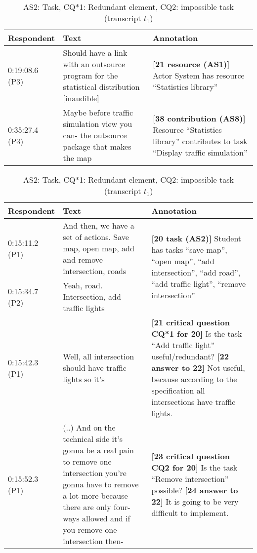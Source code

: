 \iffalse
\begin{table}[!htbp]
\begin{tabular}{|p{20mm}|p{70mm}|p{60mm}|}
\hline
Respondent & Text & Annotation\\
\hline
0:19:08.6 (P3) & Should have a link with an outsource program for the statistical distribution [inaudible] & \textbf{[21 resource (AS1)]} Actor System has resource ``Statistics library''\\
\hline
0:35:27.4 (P3) & Maybe before traffic simulation view you can- the outsource package that makes the map	& \textbf{[38 contribution (AS8)]} Resource ``Statistics library'' contributes to task ``Display traffic simulation''\\
\hline
\end{tabular}
\caption{AS1: Resource, AS8: Resource contributes to task (transcript $t_3$)}
\label{table:transcript:as1-as8}

\begin{tabular}{|p{20mm}|p{70mm}|p{60mm}|}
\hline
Respondent & Text & Annotation\\
\hline
0:15:11.2 (P1) & And then, we have a set of actions. Save map, open map, add and remove intersection, roads & \multirow{2}{60mm}{\textbf{[20 task (AS2)]} Student has tasks ``save map'', ``open map'', ``add intersection'', ``add road'', ``add traffic light'', ``remove intersection''}\\
\cline{1-2}
0:15:34.7 (P2) & Yeah, road. Intersection, add traffic lights	&\\
\hline
0:15:42.3 (P1) & Well, all intersection should have traffic lights so it's & \textbf{[21 critical question CQ*1 for 20]} Is the task ``Add traffic light'' useful/redundant? \newline
\textbf{[22 answer to 22]} Not useful, because according to the specification all intersections have traffic lights.\\
\hline
0:15:52.3 (P1) & (..) And on the technical side it's gonna be a real pain to remove one intersection you're gonna have to remove a lot more because there are only four-ways allowed and if you remove one intersection then-& \textbf{[23 critical question CQ2 for 20]} Is the task ``Remove intersection'' possible?\newline
\textbf{[24 answer to 22]} It is going to be very difficult to implement.\\
\hline
\end{tabular}
\caption{AS2: Task, CQ*1: Redundant element, CQ2: impossible task (transcript $t_1$)}
\label{table:transcript:as2-cq_star_1-cq2}


\end{table}
